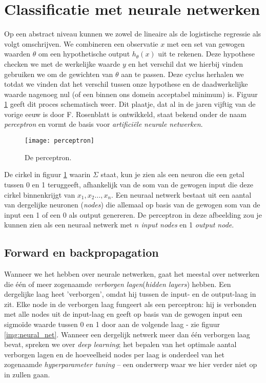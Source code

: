 
\section{Classificatie met neurale netwerken}

Op een abstract niveau kunnen we zowel de lineaire als de logistische regressie als volgt omschrijven. We combineren een observatie $x$ met een set van gewogen waarden $\theta$ om een hypothetische output $h_\theta(x)$ uit te rekenen. Deze hypothese checken we met de werkelijke waarde $y$ en het verschil dat we hierbij vinden gebruiken we om de gewichten van $\theta$ aan te passen. Deze cyclus herhalen we totdat we vinden dat het verschil tussen onze hypothese en de daadwerkelijke waarde nagenoeg nul (of een binnen ons domein acceptabel minimum) is. Figuur \ref{img:perceptron} geeft dit proces schematisch weer. Dit plaatje, dat al in de jaren vijftig van de vorige eeuw is door F. Rosenblatt is ontwikkeld, staat bekend onder de naam \textit{perceptron} en vormt de basis voor \textit{artificiële neurale netwerken}. 


\begin{figure}[h]
\centering
\texttt{[image: perceptron]}
\caption{De perceptron.\label{img:perceptron}}
\end{figure}

De cirkel in figuur \ref{img:perceptron} waarin $\Sigma$ staat, kun je zien als een neuron die een getal tussen 0 en 1 teruggeeft, afhankelijk van de som van de gewogen input die deze cirkel binnenkrijgt van $x_1, x_2 \hdots, x_n$. Een neuraal netwerk bestaat uit een aantal van dergelijke neuronen (\textit{nodes}) die allemaal op basis van de gewogen som van de input een 1 of een 0 als output genereren. De perceptron in deze afbeelding zou je kunnen zien als een neuraal netwerk met $n$ \textit{input nodes} en 1 \textit{output node}.

\subsection{Forward en backpropagation}

Wanneer we het hebben over neurale netwerken, gaat het meestal over netwerken die één of meer zogenaamde \textit{verborgen lagen}(\textit{hidden layers}) hebben. Een dergelijke laag heet 'verborgen', omdat hij tussen de input- en de output-laag in zit. Elke node in de verborgen laag fungeert als een perceptron: hij is verbonden met alle nodes uit de input-laag en geeft op basis van de gewogen input een sigmoïde waarde tussen 0 en 1 door aan de volgende laag - zie figuur \ref{img:neural_net}. Wanneer een dergelijk netwerk meer dan één verborgen laag bevat, spreken we over \textit{deep learning}; het bepalen van het optimale aantal verborgen lagen en de hoeveelheid nodes per laag is onderdeel van het zogenaamde \textit{hyperparameter tuning} – een onderwerp waar we hier verder niet op in zullen gaan.

